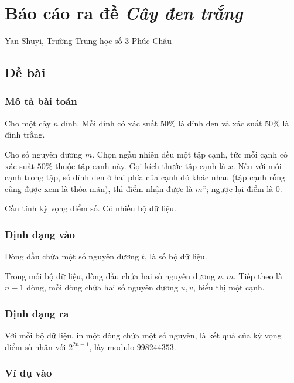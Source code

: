 \documentclass[11pt]{article}
\begin{document}
\section{Báo cáo ra đề \texorpdfstring{\emph{Cây đen trắng}}{Cây đen trắng}}

\begin{center}
Yan Shuyi, Trường Trung học số 3 Phúc Châu
\end{center}

\subsection{Đề bài}

\subsubsection{Mô tả bài toán}

Cho một cây \(n\) đỉnh. Mỗi đỉnh có xác suất \(50\%\) là đỉnh đen và xác suất
\(50\%\) là đỉnh trắng.

Cho số nguyên dương \(m\). Chọn ngẫu nhiên đều một tập cạnh, tức mỗi cạnh có
xác suất \(50\%\) thuộc tập cạnh này. Gọi kích thước tập cạnh là \(x\). Nếu với
mỗi cạnh trong tập, số đỉnh đen ở hai phía của cạnh đó khác nhau (tập cạnh rỗng
cũng được xem là thỏa mãn), thì điểm nhận được là \(m^x\); ngược lại điểm là
\(0\).

Cần tính kỳ vọng điểm số. Có nhiều bộ dữ liệu.

\subsubsection{Định dạng vào}

Dòng đầu chứa một số nguyên dương \(t\), là số bộ dữ liệu.

Trong mỗi bộ dữ liệu, dòng đầu chứa hai số nguyên dương \(n,m\). Tiếp theo là
\(n-1\) dòng, mỗi dòng chứa hai số nguyên dương \(u,v\), biểu thị một cạnh.

\subsubsection{Định dạng ra}

Với mỗi bộ dữ liệu, in một dòng chứa một số nguyên, là kết quả của kỳ vọng điểm
số nhân với \(2^{2n-1}\), lấy modulo \(998244353\).

\subsubsection{Ví dụ vào}
\end{document}
